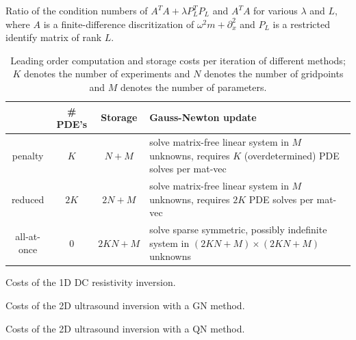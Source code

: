 \documentclass{iopart}
\begin{document}
\begin{table}
\centering

\caption{Ratio of the condition numbers of $A^T\!A + \lambda P_L^T\!P_L$ and $A^T\!A$ for various $\lambda$ and $L$, where $A$ is a finite-difference discritization of $\omega^2 m + \partial_x^2$ and $P_L$ is a restricted identify matrix of rank $L$. }
\label{table:example3}
\end{table}

\begin{table}
\begin{tabular}{c|c|c|p{5cm}}
         & \# PDE's & Storage & Gauss-Newton update \\
\hline
penalty  &  $K$  &    $N + M$     & solve matrix-free linear system in $M$ unknowns, requires $K$ (overdetermined) PDE solves per mat-vec \\
\hline
reduced  &  $2K $  &    $2N + M$     & solve matrix-free linear system in $M$ unknowns, requires $2K$ PDE solves per mat-vec                   \\
\hline
all-at-once&   0   &    $2KN + M$   &  solve sparse symmetric, possibly indefinite system in $(2KN + M) \times (2KN + M)$ unknowns \\ 
\end{tabular}
\caption{Leading order computation and storage costs per iteration of different methods; $K$ denotes the number of experiments and $N$ denotes the number of gridpoints and $M$ denotes the number of parameters.}
\label{table:costs}
\end{table}

\begin{table}
\centering

\caption{Costs of the 1D DC resistivity inversion.}
\label{table:1D_exp1}
\end{table}

\begin{table}
\centering

\caption{Costs of the 2D ultrasound inversion with a GN method.}
\label{table:2D_exp1}
\end{table}

\begin{table}
\centering

\caption{Costs of the 2D ultrasound inversion with a QN method.}
\label{table:2D_exp2}
\end{table}
\clearpage
\end{document}
